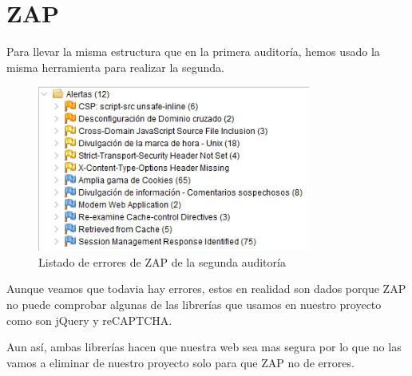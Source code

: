 \documentclass{report}
\begin{document}
        \section{ZAP}
            Para llevar la misma estructura que en la primera auditoría, hemos usado la misma herramienta para realizar la segunda.
            \begin{figure}[H]
                \centering
                \includegraphics[width=0.8\textwidth]{./img/audit2/zap1.png}
                \caption{Listado de errores de ZAP de la segunda auditoría}
            \end{figure}
            Aunque veamos que todavia hay errores, estos en realidad son dados porque ZAP no puede comprobar algunas de las librerías que usamos en nuestro proyecto como son jQuery y reCAPTCHA.
            
            Aun así, ambas librerías hacen que nuestra web sea mas segura por lo que no las vamos a eliminar de nuestro proyecto solo para que ZAP no de errores.
        \clearpage
\end{document}
